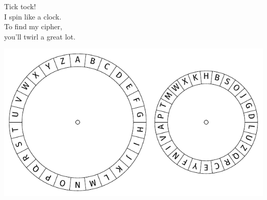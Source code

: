 \documentclass{puzz}
\begin{document}

Tick tock! \\
I spin like a clock. \\
To find my cipher, \\
you'll twirl a great lot.

{\small }

\includegraphics[width=\textwidth]{spin-like-a-clock-data/wheel.pdf}
\end{document}
